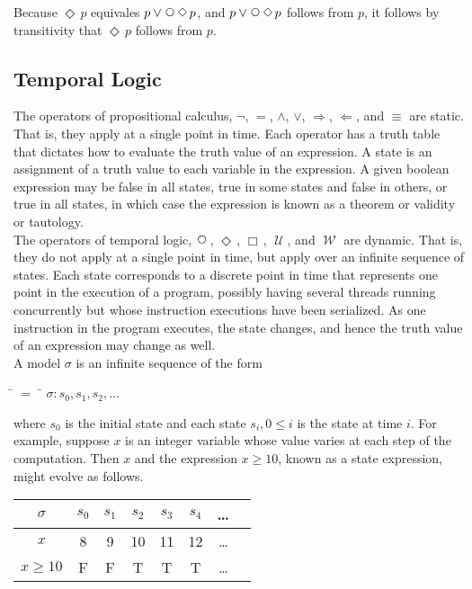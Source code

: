 \documentclass[fleqn, leqno]{article}
\newcommand{\mymathindent}{24pt}                    %
\newcommand{\impl}{\ensuremath{\Rightarrow}}        %
\newcommand{\foll}{\ensuremath{\Leftarrow}}         %
\newcommand{\Until}{\;\mathcal{U}\;}
\newcommand{\Wait}{\;\mathcal{W}\;}
\newcommand{\Next}{\;\,\text{\raisebox{3.5pt}{\circle{6}}}}
\newcommand{\Event}{\Diamond\,}
\newcommand{\Always}{\Box\,}
\begin{document}
Because $\Event p$ equivales $p \lor \Next\Event p$, and $p \lor \Next\Event p$ follows from $p$, it follows by
transitivity that $\Event p$ follows from $p$. 

\subsection{Temporal Logic}

The operators of propositional calculus, $\neg$, $=$, $\land$, $\lor$, $\impl$, $\foll$, and $\equiv$ are static.
That is, they apply at a single point in time.
Each operator has a truth table that dictates how to evaluate the truth value of an expression.
A state is an assignment of a truth value to each variable in the expression.
A given boolean expression may be false in all states, true in some states and false in others, or true in all states, in which case the expression is known as a theorem or validity or tautology.\\

The operators of temporal logic, $\Next$, $\Event$, $\Always$, $\Until$, and $\Wait$ are dynamic.
That is, they do not apply at a single point in time, but apply over an infinite sequence of states.
Each state corresponds to a discrete point in time that represents one point in the execution of a program,
possibly having several threads running concurrently but whose instruction executions have been serialized.
As one instruction in the program executes, the state changes, and hence the truth value of an expression may change as well.\\

A model $\sigma$ is an infinite sequence of the form

\begin{tabbing}
\hspace{\mymathindent} \= $= \;$ \= \kill
  \> $\sigma: s_0, s_1, s_2, \dots$
\end{tabbing}

where $s_0$ is the initial state and each state $s_i, 0 \le i$ is the state at time $i$.
For example, suppose $x$ is an integer variable whose value varies at each step of the computation.
Then $x$ and the expression $x\ge 10$, known as a state expression, might evolve as follows.\\

\begin{tabular}{c|ccccccc}
  $\sigma$      & $s_0$ & $s_1$ & $s_2$ & $s_3$ & $s_4$ & \dots \\
  \hline
  $x$           & 8     & 9     & 10    & 11    & 12    & \dots\\
  $x\ge 10$     & F     & F     & T     & T     & T     & \dots
\end{tabular}\\
\end{document}
